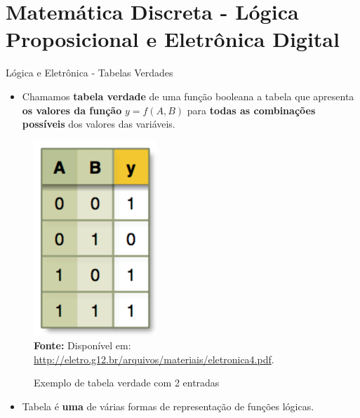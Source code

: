 \documentclass[aspectratio=169]{beamer}
\begin{document}
\section{Matemática Discreta - \newline Lógica Proposicional e Eletrônica Digital}
	\begin{frame}{Lógica e Eletrônica - Tabelas Verdades}
		\begin{itemize}
			\item Chamamos \textbf{tabela verdade} de uma função booleana a tabela que apresenta \textbf{os valores da função} $ y = f(A, B) $ para \textbf{todas as combinações possíveis} dos valores das variáveis.
		\end{itemize}
		
		\begin{multicols}{2}
			\begin{figure}[h]
				\centering
				\caption{Exemplo de tabela verdade com 2 entradas}
				\includegraphics[height=0.35\textheight]{img/ed/ed-tabela_verdade.png}
				\\
				{\footnotesize \textbf{Fonte:} Disponível em: \url{http://eletro.g12.br/arquivos/materiais/eletronica4.pdf}.}
				\label{fig:ed-tabela_verdade}
			\end{figure}
			\columnbreak
			\begin{itemize}
				\item Tabela é \textbf{uma} de várias formas de representação de funções lógicas.
			\end{itemize}
		\end{multicols}
	\end{frame}
	
\end{document}
